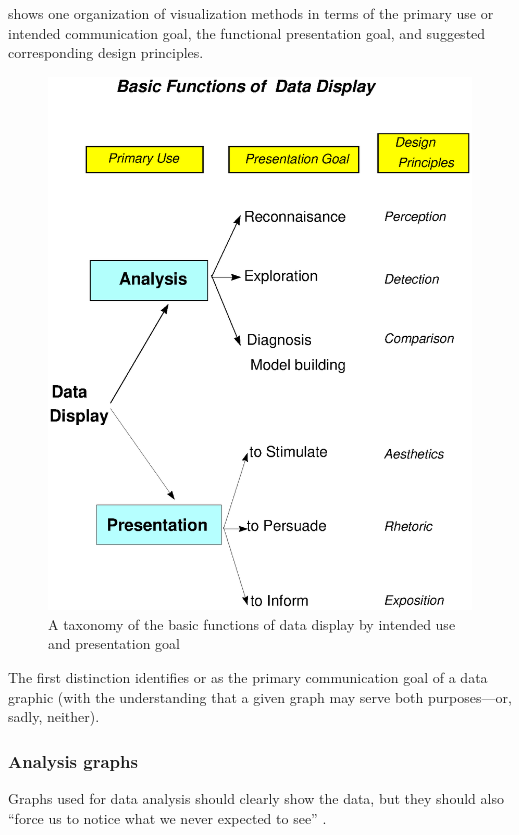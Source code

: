 shows one organization of visualization methods in terms
of the primary use or intended communication goal,
the functional presentation goal, and suggested corresponding
design principles.
\begin{figure}[htbp]
  \centering 
  \includegraphics[scale=.8]{ch1/fig/datadisp}
  \caption[Basic functions of data display]{A taxonomy of the basic functions of data display by intended use and presentation goal}\label{fig:datadisp}
\end{figure}

The first distinction identifies  or 
 as the primary
communication goal of a data graphic
(with the understanding that a given graph may serve both purposes---or,
sadly, neither).

\subsubsection{Analysis graphs}
Graphs used for data analysis should clearly show the data, but they
should also ``force us to notice what we never
expected to see''
\cite[p. vi]{Tukey:77}.

